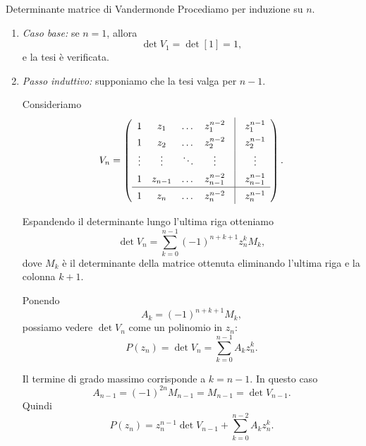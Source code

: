 \documentclass[a4paper]{article}
\begin{document}
\begin{snippetproof}{Determinante matrice di Vandermonde}
    Procediamo per induzione su \(n\).

    \begin{enumerate}
        \item \emph{Caso base:} se \(n=1\), allora
        \[
            \det V_1 = \det[1] = 1,
        \]
        e la tesi è verificata.

        \item \emph{Passo induttivo:} supponiamo che la tesi valga per \(n-1\).

        Consideriamo
        \[
            \renewcommand{\arraystretch}{1.4}
            V_n =
            \left(
                \begin{array}{cccc @{\hspace{1em}} | @{\hspace{1em}} c}
                    1 & z_1 & \dots & z_1^{n-2} & z_1^{n-1} \\
                    1 & z_2 & \dots & z_2^{n-2} & z_2^{n-1} \\
                    \vdots & \vdots & \ddots & \vdots & \vdots \\
                    1 & z_{n-1} & \dots & z_{n-1}^{n-2} & z_{n-1}^{n-1} \\
                    \hline
                    1 & z_n & \dots & z_n^{n-2} & z_n^{n-1}
                \end{array}
            \right).
        \]

        Espandendo il determinante lungo l'ultima riga otteniamo
        \[
            \det V_n
            =
            \sum_{k=0}^{n-1}
            (-1)^{n+k+1} z_n^k M_k,
        \]
        dove \(M_k\) è il determinante della matrice ottenuta eliminando
        l'ultima riga e la colonna \(k+1\).

        Ponendo
        \[
            A_k = (-1)^{n+k+1}M_k,
        \]
        possiamo vedere \(\det V_n\) come un polinomio in \(z_n\):
        \[
            P(z_n)=\det V_n
            =
            \sum_{k=0}^{n-1} A_k z_n^k.
        \]

        Il termine di grado massimo corrisponde a \(k=n-1\). In questo caso
        \[
            A_{n-1}
            =
            (-1)^{2n}M_{n-1}
            =
            M_{n-1}
            =
            \det V_{n-1}.
        \]
        Quindi
        \[
            P(z_n)
            =
            z_n^{n-1}\det V_{n-1}
            +
            \sum_{k=0}^{n-2}A_k z_n^k.
        \]


\end{enumerate}
\end{snippetproof}
\end{document}
